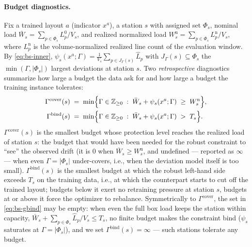 \paragraph{Budget diagnostics.}
Fix a trained layout $a$ (indicator $x^a$), a station $s$ with assigned set
$\Phi_s$, nominal load $\bar W_s = \sum_{p \in \Phi_s} L^0_p / V_s$, and
realized normalized load
$W^{\mathrm n}_s = \sum_{p \in \Phi_s} L^{\mathrm n}_p / V_s$, where
$L^{\mathrm n}_p$ is the volume-normalized realized line count of the
evaluation window. By \eqref{eq:bs-inner},
$\psi_s(x^a;\Gamma) = \frac{1}{V_s} \sum_{p \in J_\Gamma(s)} \hat L_p$ with
$J_\Gamma(s) \subseteq \Phi_s$ the $\min(\Gamma, |\Phi_s|)$ largest
deviations at station $s$. Two \emph{retrospective} diagnostics summarize
how large a budget the data ask for and how large a budget the training
instance tolerates:
\begin{align}
\Gamma^{\mathrm{cover}}(s) &\;=\;
\min \Bigl\{ \Gamma \in \mathbb Z_{\ge 0} \;:\;
\bar W_s + \psi_s(x^a;\Gamma) \;\ge\; W^{\mathrm n}_s \Bigr\},
\label{eq:bs-gcover}\\
\Gamma^{\mathrm{bind}}(s) &\;=\;
\min \Bigl\{ \Gamma \in \mathbb Z_{\ge 0} \;:\;
\bar W_s + \psi_s(x^a;\Gamma) \;>\; T_s \Bigr\}.
\label{eq:bs-gbind}
\end{align}
$\Gamma^{\mathrm{cover}}(s)$ is the smallest budget whose protection level
reaches the realized load of station $s$: the budget that would have been
needed for the robust constraint to ``see'' the observed drift (it is $0$
when $\bar W_s \ge W^{\mathrm n}_s$, and undefined --- reported as $\infty$
--- when even $\Gamma = |\Phi_s|$ under-covers, i.e., when the deviation
model itself is too small). $\Gamma^{\mathrm{bind}}(s)$ is the smallest
budget at which the robust left-hand side exceeds $T_s$ on the training data,
i.e., at which the counterpart starts to cut off the trained layout; budgets
below it exert no retraining pressure at station $s$, budgets at or above it
force the optimizer to rebalance. Symmetrically to
$\Gamma^{\mathrm{cover}}$, the set in \eqref{eq:bs-gbind} may be empty: when
even the full box load keeps the station within capacity,
$\bar W_s + \sum_{p \in \Phi_s} \hat L_p / V_s \le T_s$, no finite budget
makes the constraint bind ($\psi_s$ saturates at $\Gamma = |\Phi_s|$), and
we set $\Gamma^{\mathrm{bind}}(s) = \infty$ --- such stations tolerate any
budget.


